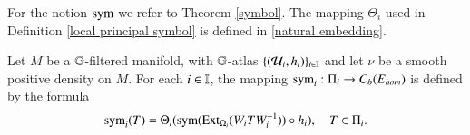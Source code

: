 \documentclass[leqno]{amsart}
\begin{document}
	
	
	
	
	For the notion ${\rm sym}$ we refer to Theorem \ref{symbol}. The mapping $\Theta_{i}$ used in Definition \ref{local principal symbol} is defined in \eqref{natural embedding}.
	\begin{definition}\label{local principal symbol}
		Let $M$ be a $\mathbb{G}$-filtered manifold, with $\mathbb{G}$-atlas $\{({\mathcal U}_{i},h_{i})\}_{i\in\mathbb I}$ and let $\nu$ be a smooth positive density on $M$. For each $i\in\mathbb I$, the mapping ${\rm sym}_{i}:\Pi_{i}\rightarrow C_{b}(E_{hom})$ is defined by the formula
		\begin{align*}
			{\rm sym}_{i}(T)=\Theta_{i}({\rm sym}({\rm Ext}_{\Omega_{i}}(W_{i}TW_{i}^{-1}))\circ h_{i}),\quad T\in\Pi_{i}.
		\end{align*}
	\end{definition}
	
	
	
\end{document}
